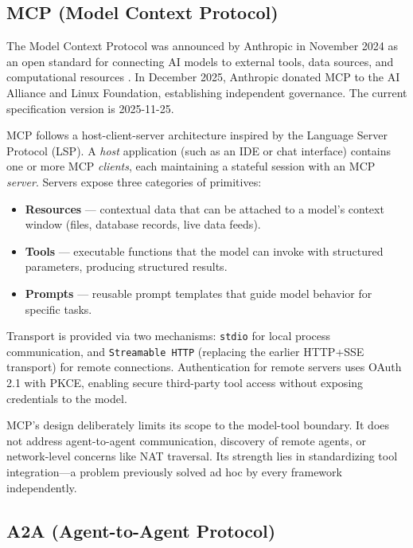 \documentclass[11pt,a4paper]{article}
\begin{document}
\subsection{MCP (Model Context Protocol)}

The Model Context Protocol was announced by Anthropic in November 2024 as an open standard for connecting AI models to external tools, data sources, and computational resources \cite{mcp-spec}. In December 2025, Anthropic donated MCP to the AI Alliance and Linux Foundation, establishing independent governance. The current specification version is 2025-11-25.

MCP follows a host-client-server architecture inspired by the Language Server Protocol (LSP). A \textit{host} application (such as an IDE or chat interface) contains one or more MCP \textit{clients}, each maintaining a stateful session with an MCP \textit{server}. Servers expose three categories of primitives:

\begin{itemize}
    \item \textbf{Resources} --- contextual data that can be attached to a model's context window (files, database records, live data feeds).
    \item \textbf{Tools} --- executable functions that the model can invoke with structured parameters, producing structured results.
    \item \textbf{Prompts} --- reusable prompt templates that guide model behavior for specific tasks.
\end{itemize}

Transport is provided via two mechanisms: \texttt{stdio} for local process communication, and \texttt{Streamable HTTP} (replacing the earlier HTTP+SSE transport) for remote connections. Authentication for remote servers uses OAuth 2.1 with PKCE, enabling secure third-party tool access without exposing credentials to the model.

MCP's design deliberately limits its scope to the model-tool boundary. It does not address agent-to-agent communication, discovery of remote agents, or network-level concerns like NAT traversal. Its strength lies in standardizing tool integration---a problem previously solved ad hoc by every framework independently.

\subsection{A2A (Agent-to-Agent Protocol)}
\end{document}
